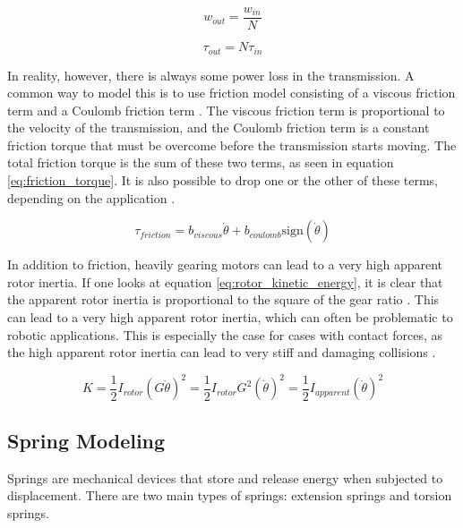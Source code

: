     \begin{equation}
        \label{eq:gear_torque}
        w_ {out} = \frac{w_{in}}{N}
    \end{equation}

    \begin{equation}
        \label{eq:gear_velocity}
        \tau_{out} = N\tau_{in}
    \end{equation}

    In reality, however, there is always some power loss in the transmission. A common way to model this is to use friction model consisting of a viscous friction term and a Coulomb friction term \cite{modern_robotics_book}. The viscous friction term is proportional to the velocity of the transmission, and the Coulomb friction term is a constant friction torque that must be overcome before the transmission starts moving. The total friction torque is the sum of these two terms, as seen in equation \ref{eq:friction_torque}. It is also possible to drop one or the other of these terms, depending on the application \cite{modern_robotics_book}.

    \begin{equation}
        \label{eq:friction_torque}
        \tau_{friction} = b_{viscous}\dot{\theta} + b_{coulomb}\text{sign}(\dot{\theta})  
    \end{equation}

    In addition to friction, heavily gearing motors can lead to a very high apparent rotor inertia. If one looks at equation \ref{eq:rotor_kinetic_energy}, it is clear that the apparent rotor inertia is proportional to the square of the gear ratio \cite{modern_robotics_book}. This can lead to a very high apparent rotor inertia, which can often be problematic to robotic applications. This is especially the case for cases with contact forces, as the high apparent rotor inertia can lead to very stiff and damaging collisions \cite{proprioceptive}.

    \begin{equation}
        \label{eq:rotor_kinetic_energy}
        K = \frac{1}{2}{I}_{rotor}(G\dot\theta)^2 = \frac{1}{2}{I}_{rotor}G^2(\dot\theta)^2 = \frac{1}{2}I_{apparent}(\dot\theta)^2
    \end{equation}

\subsection{Spring Modeling}
\label{sec:spring_theory}
Springs are mechanical devices that store and release energy when subjected to displacement. There are two main types of springs: extension springs and torsion springs.

